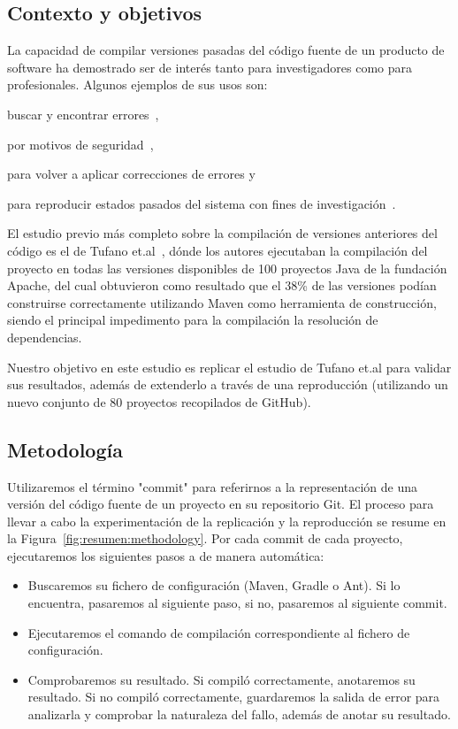 \subsection{Contexto y objetivos}
La capacidad de compilar versiones pasadas del código fuente de un producto de software ha demostrado ser de interés tanto para investigadores como para profesionales. 
Algunos ejemplos de sus usos son: 
\begin{inparaenum}[\bf(1)]
    \item buscar y encontrar errores~\cite{Zimmermann:2006:MVA:1137983.1138001}, 
    \item por motivos de seguridad~\cite{deCarnedeCarnavalet:2014:CIV:2664243.2664288}, 
    \item para volver a aplicar correcciones de errores y~\cite{tian2017mining} 
    \item para reproducir estados pasados del sistema con fines de investigación~\cite{manacero2011using,Zimmermann2008}.
\end{inparaenum}

El estudio previo más completo sobre la compilación de versiones anteriores del código es el de Tufano et.al~\cite{tufano2017there}, dónde los autores ejecutaban la compilación del proyecto en todas las versiones disponibles de 100 proyectos Java de la fundación Apache, del cual obtuvieron como resultado que el 38\% de las versiones podían construirse correctamente utilizando Maven como herramienta de construcción, siendo el principal impedimento para la compilación la resolución de dependencias.

Nuestro objetivo en este estudio es replicar el estudio de Tufano et.al para validar sus resultados, además de extenderlo a través de una reproducción (utilizando un nuevo conjunto de 80 proyectos recopilados de GitHub).

\subsection{Metodología}

Utilizaremos el término "commit" para referirnos a la representación de una versión del código fuente de un proyecto en su repositorio Git.
El proceso para llevar a cabo la experimentación de la replicación y la reproducción se resume en la Figura~\ref{fig:resumen:methodology}.
Por cada commit de cada proyecto, ejecutaremos los siguientes pasos a de manera automática:
\begin{itemize}
    \item Buscaremos su fichero de configuración (Maven, Gradle o Ant). Si lo encuentra, pasaremos al siguiente paso, si no, pasaremos al siguiente commit.
    \item Ejecutaremos el comando de compilación correspondiente al fichero de configuración.
    \item Comprobaremos su resultado. Si compiló correctamente, anotaremos su resultado. Si no compiló correctamente, guardaremos la salida de error para analizarla y comprobar la naturaleza del fallo, además de anotar su resultado.
\end{itemize}

